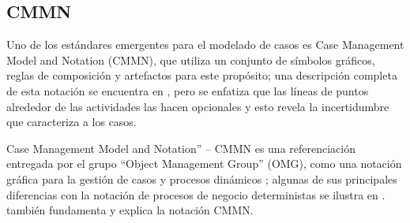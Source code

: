 


\subsection{CMMN}
\label{Sec:CMMN}

Uno de los estándares emergentes para el modelado de casos es Case Management Model and Notation (CMMN), que utiliza un conjunto de símbolos gráficos, reglas de composición y artefactos para este propósito; una descripción completa de esta notación se encuentra en \cite {Cmmn}, pero se enfatiza que las líneas de puntos alrededor de las actividades las hacen opcionales y esto revela la incertidumbre que caracteriza a los casos.

Case Management Model and Notation” – CMMN es una referenciación entregada por el grupo “Object Management Group” (OMG), como una notación gráfica para la gestión de casos y procesos dinámicos \citep{hauder2014research}; algunas de sus principales diferencias con la notación de procesos de negocio deterministas se ilustra en \citet{breitenmoser2015case}. \citet{auer2014business} también fundamenta y explica la notación CMMN.


